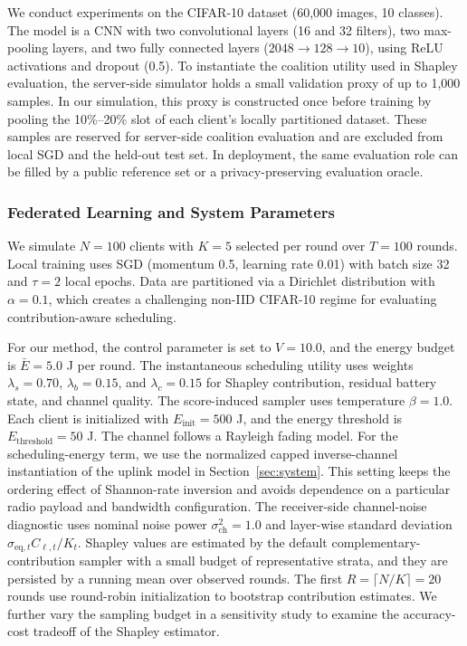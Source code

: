 \documentclass[journal]{IEEEtran}
\begin{document}
We conduct experiments on the CIFAR-10 dataset (60,000 images, 10 classes). The model is a CNN with two convolutional layers (16 and 32 filters), two max-pooling layers, and two fully connected layers ($2048 \to 128 \to 10$), using ReLU activations and dropout (0.5). To instantiate the coalition utility used in Shapley evaluation, the server-side simulator holds a small validation proxy of up to 1{,}000 samples. In our simulation, this proxy is constructed once before training by pooling the 10\%--20\% slot of each client's locally partitioned dataset. These samples are reserved for server-side coalition evaluation and are excluded from local SGD and the held-out test set. In deployment, the same evaluation role can be filled by a public reference set or a privacy-preserving evaluation oracle.

\subsubsection{Federated Learning and System Parameters}

We simulate $N=100$ clients with $K=5$ selected per round over $T=100$ rounds. Local training uses SGD (momentum 0.5, learning rate 0.01) with batch size 32 and $\tau=2$ local epochs. Data are partitioned via a Dirichlet distribution with $\alpha=0.1$, which creates a challenging non-IID CIFAR-10 regime for evaluating contribution-aware scheduling.

For our method, the control parameter is set to $V=10.0$, and the energy budget is $\bar{E}=5.0$ J per round. The instantaneous scheduling utility uses weights $\lambda_s=0.70$, $\lambda_b=0.15$, and $\lambda_c=0.15$ for Shapley contribution, residual battery state, and channel quality. The score-induced sampler uses temperature $\beta=1.0$. Each client is initialized with $E_{\text{init}}=500$ J, and the energy threshold is $E_{\text{threshold}}=50$ J. The channel follows a Rayleigh fading model. For the scheduling-energy term, we use the normalized capped inverse-channel instantiation of the uplink model in Section~\ref{sec:system}. This setting keeps the ordering effect of Shannon-rate inversion and avoids dependence on a particular radio payload and bandwidth configuration. The receiver-side channel-noise diagnostic uses nominal noise power $\sigma_{\text{ch}}^2=1.0$ and layer-wise standard deviation $\sigma_{\mathrm{eq},t}C_{\ell,t}/K_t$. Shapley values are estimated by the default complementary-contribution sampler with a small budget of representative strata, and they are persisted by a running mean over observed rounds. The first $R=\lceil N/K\rceil=20$ rounds use round-robin initialization to bootstrap contribution estimates. We further vary the sampling budget in a sensitivity study to examine the accuracy-cost tradeoff of the Shapley estimator.
\end{document}

